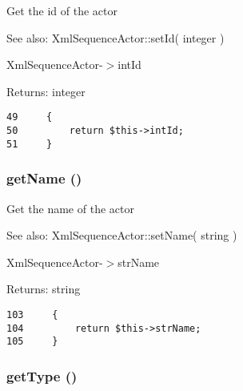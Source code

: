 Get the id of the actor

\begin{Desc}
\item[See also:]XmlSequenceActor::setId( integer ) 

XmlSequenceActor-$>$intId \end{Desc}
\begin{Desc}
\item[Returns:]integer \end{Desc}


\begin{Code}\begin{verbatim}49     {
50         return $this->intId;
51     }
\end{verbatim}
\end{Code}


\hypertarget{class_xml_sequence_actor_3d0963e68bb313b163a73f2803c64600}{
\subsubsection[{getName}]{\setlength{\rightskip}{0pt plus 5cm}getName ()}}
\label{class_xml_sequence_actor_3d0963e68bb313b163a73f2803c64600}


Get the name of the actor

\begin{Desc}
\item[See also:]XmlSequenceActor::setName( string ) 

XmlSequenceActor-$>$strName \end{Desc}
\begin{Desc}
\item[Returns:]string \end{Desc}


\begin{Code}\begin{verbatim}103     {
104         return $this->strName;
105     }
\end{verbatim}
\end{Code}


\hypertarget{class_xml_sequence_actor_830b5c75df72b32396701bc563fbe3c7}{
\subsubsection[{getType}]{\setlength{\rightskip}{0pt plus 5cm}getType ()}}
\label{class_xml_sequence_actor_830b5c75df72b32396701bc563fbe3c7}


